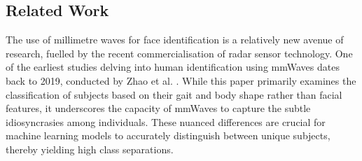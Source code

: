 \documentclass{mpaper}
\begin{document}
\subsection{Related Work}
The use of millimetre waves for face identification is a relatively new avenue of research, fuelled by the recent commercialisation of radar sensor technology. One of the earliest studies delving into human identification using mmWaves dates back to 2019, conducted by Zhao et al. \cite{zhao2019mid}. While this paper primarily examines the classification of subjects based on their gait and body shape rather than facial features, it underscores the capacity of mmWaves to capture the subtle idiosyncrasies among individuals. These nuanced differences are crucial for machine learning models to accurately distinguish between unique subjects, thereby yielding high class separations.
\end{document}
